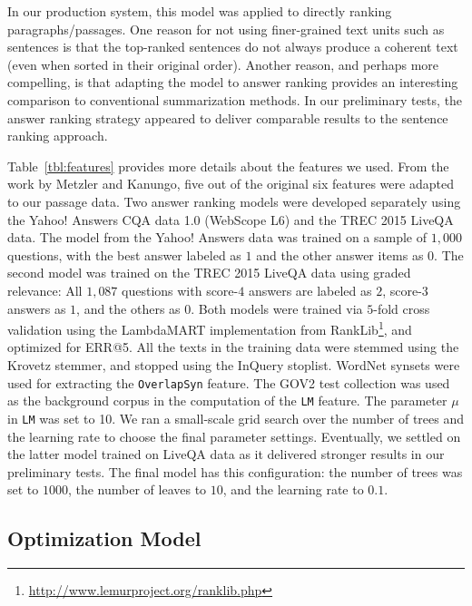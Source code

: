 \documentclass[a4paper,10pt,conference,compsocconf,final]{IEEEtran}
\begin{document}
In our production system, this model was applied to directly
ranking paragraphs/passages.
One reason for not using finer-grained text units such as sentences is
that the top-ranked sentences do not always produce a coherent text
(even when sorted in their original order).
Another reason, and  perhaps more compelling, is that adapting the model to
answer ranking provides an interesting comparison to conventional
summarization methods.
In our preliminary tests, the answer ranking strategy appeared to
deliver comparable results to the sentence ranking approach.



Table~\ref{tbl:features} provides more details about the features we
used.
From the work by Metzler and Kanungo, five out of the original six
features were adapted to our passage data.
Two answer ranking models were developed separately using the Yahoo!
Answers CQA data 1.0 (WebScope L6) and the TREC 2015 LiveQA data.
The model from the Yahoo!  Answers data was trained on a sample of 
$1{,}000$ questions, with the best answer labeled as $1$ and the 
other answer items as $0$.
The second model was trained on the TREC 2015 LiveQA data using
graded relevance: All $1{,}087$ questions with score-$4$ answers are
labeled as $2$, score-$3$ answers as $1$, and the others as $0$.
Both models were trained via $5$-fold cross validation using the
LambdaMART implementation from
RankLib\footnote{\url{http://www.lemurproject.org/ranklib.php}}, and
optimized for ERR@5.
All the texts in the training data were stemmed using the Krovetz stemmer, and
stopped using the InQuery stoplist.
WordNet synsets were used for extracting the \texttt{OverlapSyn} feature.
The GOV2 test collection was used as the background corpus in the computation
of the \texttt{LM} feature.
The parameter $\mu$ in \texttt{LM} was set to 10.
We ran a small-scale grid search over the number of trees and the
learning rate to choose the final parameter settings.
Eventually, we settled on the latter model trained on LiveQA data as
it delivered stronger results in our preliminary tests.
The final model has this configuration: the number of trees was set to
$1000$, the number of leaves to $10$, and the learning rate
to $0.1$.

\subsection{Optimization Model}\label{sec:opt}
\end{document}
